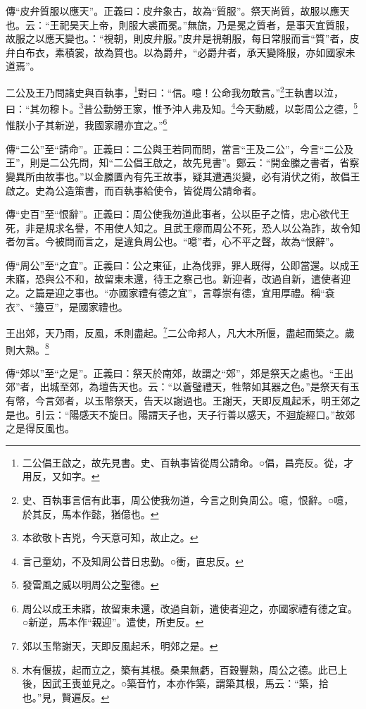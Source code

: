 {\noindent\zhuan{}\fzbyks 傳“皮弁質服以應天”。正義曰：皮弁象古，故為“質服”。祭天尚質，故服以應天也。云：“王祀昊天上帝，則服大裘而冕。”無旒，乃是冕之質者，是事天宜質服，故服之以應天變也。：“視朝，則皮弁服。”皮弁是視朝服，每日常服而言“質”者，皮弁白布衣，素積裳，故為質也。以為爵弁，“必爵弁者，承天變降服，亦如國家未道焉”。 \par}

二公及王乃問諸史與百執事，\footnote{二公倡王啟之，故先見書。史、百執事皆從周公請命。○倡，昌亮反。從，才用反，又如字。}對曰：“信。噫！公命我勿敢言。”\footnote{史、百執事言信有此事，周公使我勿道，今言之則負周公。噫，恨辭。○噫，於其反，馬本作懿，猶億也。}王執書以泣，曰：“其勿穆卜。\footnote{本欲敬卜吉兇，今天意可知，故止之。}昔公勤勞王家，惟予沖人弗及知。\footnote{言己童幼，不及知周公昔日忠勤。○衝，直忠反。}今天動威，以彰周公之德，\footnote{發雷風之威以明周公之聖德。}惟朕小子其新逆，我國家禮亦宜之。”\footnote{周公以成王未寤，故留東未還，改過自新，遣使者迎之，亦國家禮有德之宜。○新逆，馬本作“親迎”。遣使，所吏反。}

{\noindent\zhuan{}\fzbyks 傳“二公”至“請命”。正義曰：二公與王若同而問，當言“王及二公”，今言“二公及王”，則是二公先問，知“二公倡王啟之，故先見書”。鄭云：“開金縢之書者，省察變異所由故事也。”以金縢匱內有先王故事，疑其遭遇災變，必有消伏之術，故倡王啟之。史為公造策書，而百執事給使令，皆從周公請命者。 \par}

{\noindent\zhuan{}\fzbyks 傳“史百”至“恨辭”。正義曰：周公使我勿道此事者，公以臣子之情，忠心欲代王死，非是規求名譽，不用使人知之。且武王瘳而周公不死，恐人以公為詐，故令知者勿言。今被問而言之，是違負周公也。“噫”者，心不平之聲，故為“恨辭”。 \par}

{\noindent\zhuan{}\fzbyks 傳“周公”至“之宜”。正義曰：公之東征，止為伐罪，罪人既得，公即當還。以成王未寤，恐與公不和，故留東未還，待王之察己也。新迎者，改過自新，遣使者迎之。之篇是迎之事也。“亦國家禮有德之宜”，言尊崇有德，宜用厚禮。稱“袞衣”、“籩豆”，是國家禮也。 \par}

王出郊，天乃雨，反風，禾則盡起。\footnote{郊以玉幣謝天，天即反風起禾，明郊之是。}二公命邦人，凡大木所偃，盡起而築之。歲則大熟。\footnote{木有偃拔，起而立之，築有其根。桑果無虧，百穀豐熟，周公之德。此已上後，因武王喪並見之。○築音竹，本亦作築，謂築其根，馬云：“築，拾也。”見，賢遍反。}

{\noindent\zhuan{}\fzbyks 傳“郊以”至“之是”。正義曰：祭天於南郊，故謂之“郊”，郊是祭天之處也。“王出郊”者，出城至郊，為壇告天也。云：“以蒼璧禮天，牲幣如其器之色。”是祭天有玉有幣，今言郊者，以玉幣祭天，告天以謝過也。王謝天，天即反風起禾，明王郊之是也。引云：“陽感天不旋日。陽謂天子也，天子行善以感天，不迴旋經口。”故郊之是得反風也。 \par}

